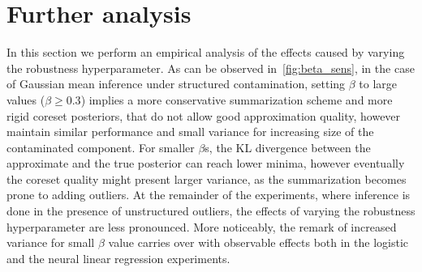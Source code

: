 \section{Further analysis}
\label{sec:sensitivity}

In this section we perform an empirical analysis of the effects caused by varying the robustness hyperparameter. As can be observed in~\cref{fig:beta_sens}, in the case of Gaussian mean inference under structured contamination, setting $\beta$ to large values ($\beta \geq 0.3$) implies a more conservative summarization scheme and more rigid coreset posteriors, that do not allow good approximation quality, however maintain similar performance and small variance for increasing size of the contaminated component. For smaller $\beta$s, the KL divergence between the approximate and the true posterior can reach lower minima, however eventually the coreset quality might present larger variance, as the summarization becomes prone to adding outliers. At the remainder of the experiments, where inference is done in the presence of unstructured outliers, the effects of varying the robustness hyperparameter are less pronounced. More noticeably, the remark of increased variance for small $\beta$ value carries over with observable effects both in the logistic and the neural linear regression experiments.

